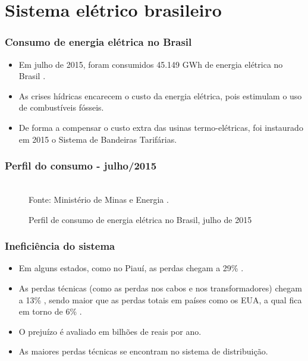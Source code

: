 \documentclass[10pt]{beamer}
\begin{document}
\section{Sistema elétrico brasileiro}

\begin{frame}[fragile]
  \frametitle{Consumo de energia elétrica no Brasil}
    \begin{itemize}
        \item Em julho de 2015, foram consumidos \alert{45.149 GWh} de energia elétrica no Brasil \cite{boletimMME}.
        
        \item As crises hídricas encarecem o custo da energia elétrica, pois estimulam o uso de combustíveis fósseis.
        
        \item De forma a compensar o custo extra das usinas termo-elétricas, foi instaurado em 2015 o Sistema de Bandeiras Tarifárias.
    \end{itemize}
\end{frame}

\begin{frame}[fragile]
    \frametitle{Perfil do consumo - julho/2015}
    \begin{figure}
        \centering
        \caption{Perfil de consumo de energia elétrica no Brasil, julho de 2015}
        \\
        \small Fonte: Ministério de Minas e Energia \cite{boletimMME}.
        \label{fig:perfil}
        \end{figure}
\end{frame}

\begin{frame}[fragile]
  \frametitle{Ineficiência do sistema}
  \begin{itemize}
      \item Em alguns estados, como no Piauí, as perdas chegam a \alert{29\%} \cite{CostaNorte}.
      
      \item As perdas técnicas (como as perdas nos cabos e nos transformadores) chegam a 13\% \cite{CostaNorte}, sendo maior que as perdas totais em países como os EUA, a qual fica em torno de 6\% \cite{Queiroz}.
      
      \item O prejuízo é avaliado em bilhões de reais por ano.
      
      \item As maiores perdas técnicas se encontram no sistema de distribuição.
    \end{itemize}
\end{frame}
\end{document}

